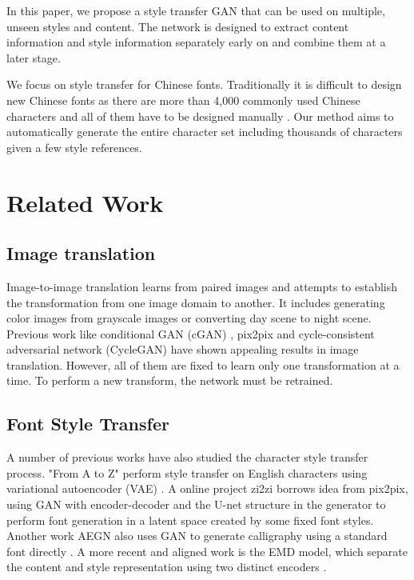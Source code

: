 \documentclass[10pt,twocolumn,letterpaper]{article}
\begin{document}
In this paper, we propose a style transfer GAN that can be used on multiple, unseen styles and content. The network is designed to extract content information and style information separately early on and combine them at a later stage. 

We focus on style transfer for Chinese fonts. Traditionally it is difficult to design new Chinese fonts as there are more than 4,000 commonly used Chinese characters and all of them have to be designed manually \cite{Authors02}. Our method aims to automatically generate the entire character set including thousands of characters given a few style references.

\section{Related Work}

\subsection{Image translation}
Image-to-image translation learns from paired images and attempts to establish the transformation from one image domain to another. It includes generating color images from grayscale images or converting day scene to night scene. Previous work like conditional GAN (cGAN) \cite{Authors01}, pix2pix\cite{DBLP:journals/corr/IsolaZZE16} and cycle-consistent adversarial network (CycleGAN)\cite{DBLP:journals/corr/ZhuPIE17} have shown appealing results in image translation. However, all of them are fixed to learn only one transformation at a time. To perform a new transform, the network must be retrained.

\subsection{Font Style Transfer}
A number of previous works have also studied the character style transfer process. "From A to Z" perform style transfer on English characters using variational autoencoder (VAE) \cite{DBLP:journals/corr/UpchurchSB16}. A online project zi2zi borrows idea from pix2pix, using GAN with encoder-decoder and the U-net structure in the generator to perform font generation in a latent space created by some fixed font styles. Another work AEGN also uses GAN to generate calligraphy using a standard font directly \cite{DBLP:journals/corr/LyuBYZHL17}. A more recent and aligned work is the EMD model, which separate the content and style representation using two distinct encoders \cite{DBLP:journals/corr/abs-1711-06454}. 
\end{document}
